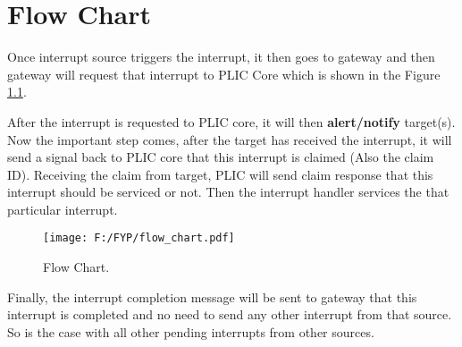 
\chapter{Flow Chart}
\label{Chapter8}

Once interrupt source triggers the interrupt, it then goes to gateway and then gateway will request that interrupt to PLIC Core which is shown in the Figure \ref{fig:flow_chart}. 

\par
After the interrupt is requested to PLIC core, it will then \textbf{alert/notify} target(s). Now the important step comes, after the target has received the interrupt, it will send a signal back to PLIC core that this interrupt is claimed (Also the claim ID). Receiving the claim from target, PLIC will send claim response that this interrupt should be serviced or not. Then the interrupt handler services the that particular interrupt. 


\begin{figure}[h]
  \centering
  \texttt{[image: F:/FYP/flow\_chart.pdf]}
  \caption{Flow Chart.}
  \label{fig:flow_chart}
\end{figure}


Finally, the interrupt completion message will be sent to gateway that this interrupt is completed and no need to send any other interrupt from that source. So is the case with all other pending interrupts from other sources.

